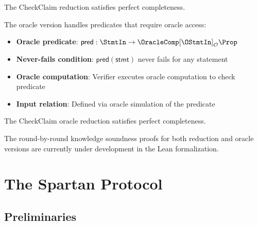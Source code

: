 \begin{theorem}
    The CheckClaim reduction satisfies perfect completeness.
\end{theorem}

\begin{definition}
    \label{def:checkclaim_oracle_reduction}
    The oracle version handles predicates that require oracle access:
    \begin{itemize}
        \item \textbf{Oracle predicate}: $\mathsf{pred} : \StmtIn \to \OracleComp[\OStmtIn]_{\mathcal{O}} \Prop$
        \item \textbf{Never-fails condition}: $\mathsf{pred}(\mathsf{stmt})$ never fails for any statement
        \item \textbf{Oracle computation}: Verifier executes oracle computation to check predicate
        \item \textbf{Input relation}: Defined via oracle simulation of the predicate
    \end{itemize}
\end{definition}

\begin{theorem}
    The CheckClaim oracle reduction satisfies perfect completeness.
\end{theorem}

\begin{remark}
    The round-by-round knowledge soundness proofs for both reduction and oracle versions are currently under development in the Lean formalization.
\end{remark}


\section{The Spartan Protocol}\label{sec:spartan}

\subsection{Preliminaries}

